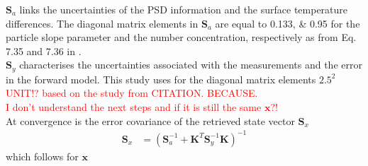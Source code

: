 $\mathbf{S}_a$ links the uncertainties of the PSD information and the surface temperature differences. The diagonal matrix elements in $\mathbf{S}_a$ are equal to \numlist{0.133;0.95} for the particle slope parameter and the number concentration, respectively as from  Eq. 7.35 and 7.36 in \citet{wood_estimation_2011}. \\
$\mathbf{S}_y$ characterises the uncertainties associated with the measurements and the error in the forward model. This study uses for the diagonal matrix elements $2.5^2$ \textcolor{red}{UNIT!? based on the study from CITATION. BECAUSE.}
\\
%
\textcolor{red}{I don't understand the next steps and if it is still the same $\mathbf{x}$?!} 
\\
At convergence is the error covariance of the retrieved state vector $\mathbf{S}_x$
\begin{align}
	\mathbf{S}_x & = \left( \mathbf{S}_a^{-1} + \mathbf{K}^T \mathbf{S}_y^{-1} \mathbf{K} \right)^{-1}
\end{align}
which follows for $\mathbf{x}$
